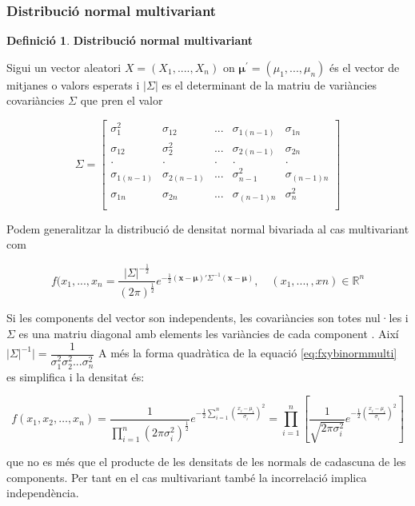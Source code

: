 \documentclass[
  catalan,
]{article}
\theoremstyle{definition}
\newtheorem{definition}{Definició}[section]
\theoremstyle{definition}
\theoremstyle{definition}
\theoremstyle{definition}
\theoremstyle{remark}
\begin{document}
\subsubsection{Distribució normal multivariant}\label{distribuciuxf3-normal-multivariant}

\begin{definition}
\textbf{Distribució normal multivariant}

Sigui un vector aleatori \(X=(X_1,....,X_n)\) on \(\boldsymbol{\mu}^{\prime}=(\mu_1,...,\mu_n)\) és el vector de mitjanes o valors esperats i \(|\Sigma|\) es el determinant de la matriu de variàncies covariàncies \(\Sigma\) que pren el valor

\[
\Sigma=
\begin{bmatrix} 
\sigma_1^2 & \sigma_{12} & ... & \sigma_{1(n-1)}  & \sigma_{1n} \\
\sigma_{12}  & \sigma_2^2 & ... & \sigma_{2(n-1)}  & \sigma_{2n} \\  
.  & . & . & .  & . \\  
\sigma_{1(n-1)}  & \sigma_{2(n-1)} & ... & \sigma_{n-1}^2  & \sigma_{(n-1)n} \\  
\sigma_{1n}  & \sigma_{2n} & ... &  \sigma_{(n-1)n}  & \sigma_n^2\\  
\end{bmatrix} 
\]

Podem generalitzar la distribució de densitat normal bivariada al cas multivariant com

\[
f(x_1,...,x_n=\dfrac {|\Sigma|^{-\frac{1}{2}}}{(2\pi)^\frac{1}{2}} e^{ -\frac{1}{2} (\mathbf{x} - \boldsymbol{\mu})' \Sigma^{-1} (\mathbf{x} - \boldsymbol{\mu})} , \quad  (x_1,...,,xn) \in   \mathbb{R}^n  \label{eq:fxybinormmulti}
\]
\end{definition}

Si les components del vector son independents, les covariàncies son totes nul·les i \(\Sigma\) es una matriu diagonal amb elements les variàncies de cada component . Així \(|\Sigma|^{-1}|=\dfrac{1}{\sigma_1^2\sigma_2^2...\sigma_n^2}\) A més la forma quadràtica de la equació \eqref{eq:fxybinormmulti} es simplifica i la densitat és:

\[
f(x_1, x_2, \dots, x_n) = \frac{1}{\prod_{i=1}^n (2\pi\sigma_i^2)^{\frac{1}{2}}} e^{-\frac{1}{2} \sum_{i=1}^n \left(\frac{x_i - \mu_i}{\sigma_i}\right)^2} = \prod_{i=1}^n \left[ \frac{1}{\sqrt{2\pi\sigma_i^2}} e^{-\frac{1}{2} \left(\frac{x_i - \mu_i}{\sigma_i}\right)^2} \right]
\]

que no es més que el producte de les densitats de les normals de cadascuna de les components. Per tant en el cas multivariant també la incorrelació implica independència.
\end{document}
